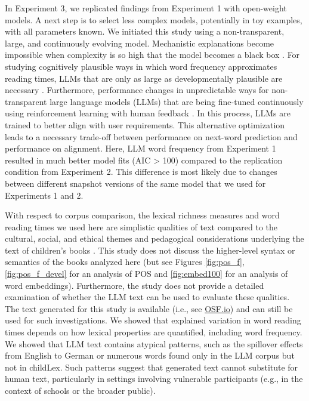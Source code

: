 \documentclass[doc, a4paper, anonymous]{apa7}
\begin{document}
In Experiment 3, we replicated findings from Experiment 1 with open-weight models. A next step is to select less complex models, potentially in toy examples, with all parameters known. We initiated this study using a non-transparent, large, and continuously evolving model. Mechanistic explanations become impossible when complexity is so high that the model becomes a black box \citep{bender_dangers_2021}. For studying cognitively plausible ways in which word frequency approximates reading times, LLMs that are only as large as developmentally plausible are necessary \citep[see][for recent work in this direction]{feng_is_2024, tan_devbench_2024, hu_auxiliary_2024}. Furthermore, performance changes in unpredictable ways for non-transparent large language models (LLMs) that are being fine-tuned continuously using reinforcement learning with human feedback  \citep[RLHF][]{bai_training_2022, chung_scaling_2024, perez_red_2022, ziegler_fine-tuning_2020}. In this process, LLMs are trained to better align with user requirements. This alternative optimization leads to a necessary trade-off between performance on next-word prediction and performance on alignment. Here, LLM word frequency from Experiment 1 resulted in much better model fits (AIC > 100) compared to the replication condition from Experiment 2. This difference is most likely due to changes between different snapshot versions of the same model that we used for Experiments 1 and 2.   

With respect to corpus comparison, the lexical richness measures and word reading times we used here are simplistic qualities of text compared to the cultural, social, and ethical themes and pedagogical considerations underlying the text of children's books \citep[see e.g.][]{korochkina_morphology_2025}. This study does not discuss the higher-level syntax or semantics of the books analyzed here (but see Figures \ref{fig:pos_f}, \ref{fig:pos_f_devel} for an analysis of POS and \ref{fig:embed100} for an analysis of word embeddings). Furthermore, the study does not provide a detailed examination of whether the LLM text can be used to evaluate these qualities. The text generated for this study is available (i.e., see \href{dx.doi.org/10.17605/OSF.IO/WMUVJ}{OSF.io}) and can still be used for such investigations. We showed that explained variation in word reading times depends on how lexical properties are quantified, including word frequency. We showed that LLM text contains atypical patterns, such as the spillover effects from English to German or numerous words found only in the LLM corpus but not in childLex. Such patterns suggest that generated text cannot substitute for human text, particularly in settings involving vulnerable participants (e.g., in the context of schools or the broader public). 
\end{document}
